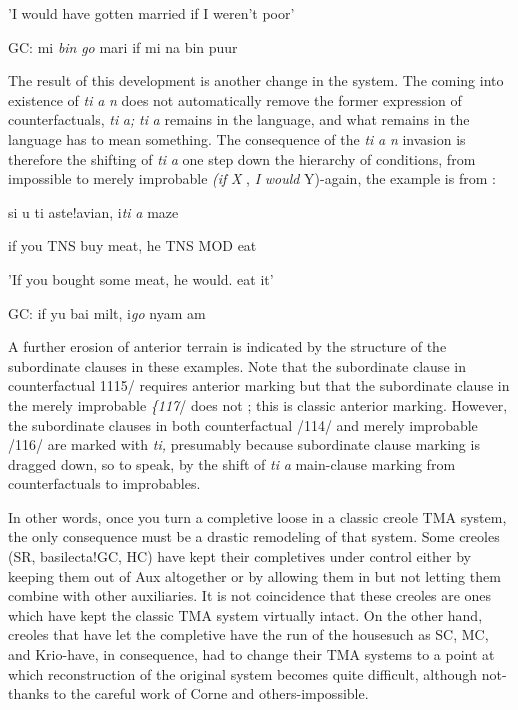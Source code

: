 'I would have gotten married if I weren't poor' 

\ea\label{ex:115}
 GC: mi \textit{bin} \textit{go} mari if mi na bin puur
\glt
\z

The result of this development is another change in the system. The coming into existence of \textit{ti} \textit{a} \textit{n} does not automatically remove the former expression of counterfactuals, \textit{ti} \textit{a;} \textit{ti} \textit{a} remains in the lan\-guage, and what remains in the language has to mean something. The consequence of the \textit{ti} \textit{a} \textit{n} invasion is therefore the shifting of \textit{ti} \textit{a} one step down the hierarchy of conditions, from impossible to merely
improbable \textit{(}\textit{i}\textit{f} \textit{X} , \textit{I} \textit{would} Y){}-again, the example is from \citet[106]{Corne1977}:



\ea\label{ex:116}
 si u ti aste!avian, i\textit{ti} \textit{a }maze
\glt
\z

if you TNS buy meat, he TNS MOD eat

'If you bought some meat, he would. eat it'

\ea\label{ex:117}
GC: if yu bai milt, i\textit{go} nyam am
\glt
\z


A further erosion of anterior terrain is indicated by the structure of the subordinate clauses in these examples. Note that the subordinate clause in counterfactual 1115/ requires anterior marking but that the subordinate clause in the merely improbable \textit{\{117}/ does not ; this is classic anterior marking. However, the subordinate clauses in both counterfactual /114/ and merely improbable /116/ are marked with \textit{ti,} presumably because subordinate clause marking is dragged down, so to speak, by the shift of \textit{ti} \textit{a }main-clause marking from counterfactuals
to improbables.

In other words, once you turn a completive loose in a classic creole TMA system, the only consequence must be a drastic remodeling of that system. Some creoles (SR, basilecta!GC, HC) have kept their completives under control either by keeping them out of Aux al\-together or by allowing them in but not letting them combine with other auxiliaries. It is not coincidence that these creoles are ones which have kept the classic TMA system virtually intact. On the other hand, creoles that have let the completive have the run of the house\-such as SC, MC, and Krio-have, in consequence, had to change their TMA systems to a point at which reconstruction of the original system becomes quite difficult, although not-thanks to the careful work of Corne and others-impossible.

